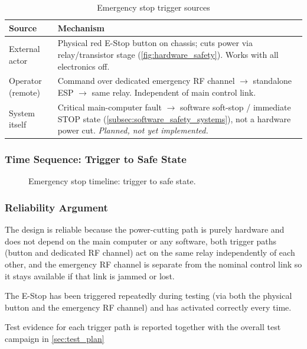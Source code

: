 \begin{table}[h]
    \footnotesize
    \centering
    \caption{Emergency stop trigger sources}
    \label{tab:estop-triggers}
    \begin{tabularx}{\linewidth}{@{}p{2.6cm} X@{}}
        \toprule
        \textbf{Source} & \textbf{Mechanism} \\
        \midrule
        External actor & Physical red E-Stop button on chassis; cuts power via relay/transistor stage (\autoref{fig:hardware_safety}). Works with all electronics off. \\
        Operator (remote) & Command over dedicated emergency RF channel $\rightarrow$ standalone ESP $\rightarrow$ same relay. Independent of main control link. \\
        System itself & Critical main-computer fault $\rightarrow$ software soft-stop / immediate STOP state (\autoref{subsec:software_safety_systems}), not a hardware power cut. \textit{Planned, not yet implemented.} \\
        \bottomrule
    \end{tabularx}
\end{table}

\subsubsection{Time Sequence: Trigger to Safe State}
\label{sec:estop-timing}

\begin{figure}[h]
    \centering
    \caption{Emergency stop timeline: trigger to safe state.}
    \label{fig:estop-timeline}
\end{figure}

\subsubsection{Reliability Argument}
\label{sec:estop-reliability}

The design is reliable because the power-cutting path is purely hardware and does not depend on the main computer or any software, both trigger paths (button and dedicated RF channel) act on the same relay independently of each other, and the emergency RF channel is separate from the nominal control link so it stays available if that link is jammed or lost.

The E-Stop has been triggered repeatedly during testing (via both the physical button and the emergency RF channel) and has activated correctly every time.

Test evidence for each trigger path is reported together with the overall test campaign in \autoref{sec:test_plan}